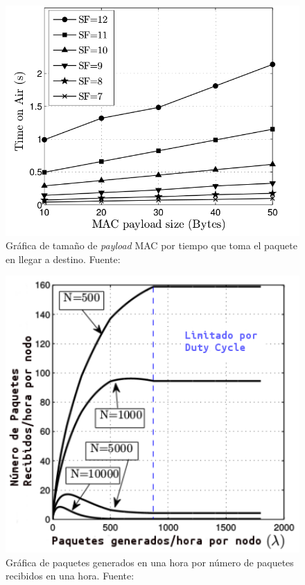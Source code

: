 \begin{justify}
\begin{figure}[!b]
\centering
\includegraphics[scale=0.4]{images/estadoarte1.png}
\caption{Gráfica de tamaño de \textit{payload} MAC por tiempo que toma el paquete en llegar a destino. Fuente:\cite{Xavier}}
\label{arte:1}
\end{figure}
\begin{figure}[!ht]
\centering
\includegraphics[scale=0.5]{images/estadoarte2.png}
\caption{Gráfica de paquetes generados en una hora por número de paquetes recibidos en una hora. Fuente:\cite{Xavier}}
\label{arte:2}
\end{figure}

\end{justify}
